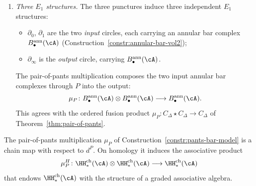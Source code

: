 \begin{construction}
\begin{enumerate}[label=\textup{(\roman*)}]
\item \emph{Three $E_1$ structures.}
 The three punctures induce three independent $E_1$ structures:
 \begin{itemize}
 \item $\partial_0$, $\partial_1$ are the two
 \emph{input} circles, each carrying an annular bar complex
 $B^{\mathrm{ann}}_\bullet(\cA)$
 (Construction~\ref{constr:annular-bar-vol2});
 \item $\partial_\infty$ is the \emph{output} circle,
 carrying $B^{\mathrm{ann}}_\bullet(\cA)$.
 \end{itemize}
 The pair-of-pants multiplication composes the two input
 annular bar complexes through $P$ into the output:
 \[
 \mu_P \colon
 B^{\mathrm{ann}}_\bullet(\cA)
 \otimes
 B^{\mathrm{ann}}_\bullet(\cA)
 \longrightarrow
 B^{\mathrm{ann}}_\bullet(\cA).
 \]
 This agrees with the ordered fusion product
 $\mu_P\colon C_\Delta\star C_\Delta\to C_\Delta$
 of Theorem~\textup{\ref{thm:pair-of-pants}}.
\end{enumerate}
\end{construction}

\begin{proposition}%
\label{prop:pants-product-HH}%
%
%
The pair-of-pants multiplication $\mu_P$ of
Construction~\textup{\ref{constr:pants-bar-model}} is a chain map
with respect to $d^P$. On homology it induces the associative
product
\begin{equation}\label{eq:pants-HH-product}
 \mu_P^H \colon
 \HH^{\mathrm{ch}}_*(\cA)
 \otimes
 \HH^{\mathrm{ch}}_*(\cA)
 \longrightarrow
 \HH^{\mathrm{ch}}_*(\cA)
\end{equation}
that endows $\HH^{\mathrm{ch}}_*(\cA)$ with the structure of a
graded associative algebra.
\end{proposition}

